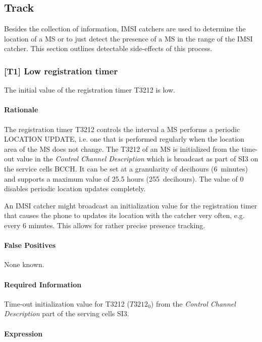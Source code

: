 \documentclass[a4paper,11pt,notitlepage,bigheadings,oneside]{scrartcl}
\begin{document}
\subsection{Track}

Besides the collection of information, IMSI catchers are used to determine the
location of a MS or to just detect the presence of a MS in the range of the
IMSI catcher. This section outlines detectable side-effects of this process.

\subsubsection{[T1] Low registration timer}

The initial value of the registration timer T3212 is low.

\paragraph{Rationale}

The registration timer T3212 controls the interval a MS performs a periodic
LOCATION UPDATE, i.e. one that is performed regularly when the location area of
the MS does not change. The T3212 of an MS is initialized from the time-out
value in the \emph{Control Channel Description} which is broadcast as part of
SI3 on the service cells BCCH. It can be set at a granularity of decihours
(6~minutes) and supports a maximum value of 25.5 hours (255~decihours). The
value of 0 disables periodic location updates completely.

An IMSI catcher might broadcast an initialization value for the registration
timer that causes the phone to updates its location with the catcher very
often, e.g. every 6 minutes. This allows for rather precise presence tracking.

\paragraph{False Positives}

None known.

\paragraph{Required Information}

Time-out initialization value for T3212 ($T3212_0$) from the \emph{Control
Channel Description} part of the serving cells SI3.

\paragraph{Expression}
\end{document}
